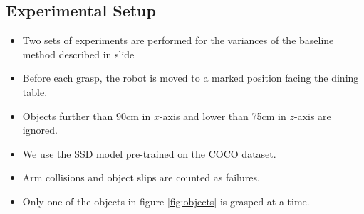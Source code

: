 \documentclass[runningheads]{../llncs}
\begin{document}
\subsection{Experimental Setup}

\begin{itemize}
    \item Two sets of experiments are performed for the variances of the baseline method described in slide
    \item Before each grasp, the robot is moved to a marked position facing the dining table.
    \item Objects further than 90cm in $ x $-axis and lower than 75cm in $ z $-axis are ignored.
    \item We use the SSD model pre-trained on the COCO dataset.
    \item Arm collisions and object slips are counted as failures.
    \item Only one of the objects in figure \ref{fig:objects} is grasped at a time.
\end{itemize}
\end{document}
